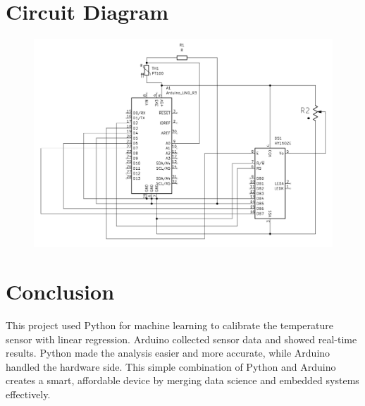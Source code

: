 \documentclass[journal,12pt,onecolumn]{IEEEtran}
\begin{document}
\section{\textbf{Circuit Diagram}}
\begin{figure}[H]
    \centering
    \includegraphics[width=0.8\columnwidth]{figs/circuit diagram.jpeg}
    \label{fig:crtdiagram}
\end{figure}



\section{\textbf{Conclusion}}

This project used Python for machine learning to calibrate the temperature sensor with linear regression. Arduino collected sensor data and showed real-time results. Python made the analysis easier and more accurate, while Arduino handled the hardware side. This simple combination of Python and Arduino creates a smart, affordable device by merging data science and embedded systems effectively.
\end{document}
